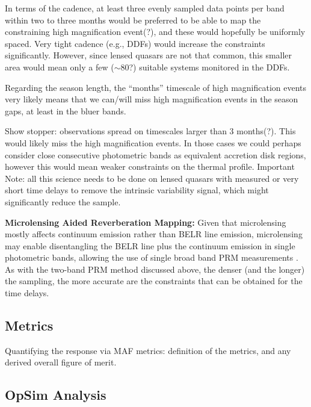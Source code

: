 In terms of the cadence, at least three evenly sampled data points per
band within two to three months would be preferred to be able to map
the constraining high magnification event(?), and these would
hopefully be uniformly spaced. Very tight cadence (e.g., DDFs) would
increase the constraints significantly. However, since lensed quasars
are not that common, this smaller area would mean only a few
($\sim80$?) suitable systems monitored in the DDFs.

Regarding the season length, the ``months'' timescale of high
magnification events very likely means that we can/will miss high
magnification events in the season gaps, at least in the bluer bands.

Show stopper: observations spread on timescales larger than 3 months(?).
This would likely miss the high magnification events. In those cases
we could perhaps consider close consecutive photometric bands as
equivalent accretion disk regions, however this would mean weaker
constraints on the thermal profile.
%
Important Note: all this science needs to be done on lensed quasars
with measured or very short time delays to remove the intrinsic
variability signal, which might significantly reduce the sample.

{\bf Microlensing Aided Reverberation Mapping:} Given that
microlensing mostly affects continuum emission rather than BELR line
emission, microlensing may enable disentangling the BELR line plus the
continuum emission in single photometric bands, allowing the use of
single broad band PRM measurements \citep{SluseandTewes2014}. As with
the two-band PRM method discussed above, the denser (and the longer)
the sampling, the more accurate are the constraints that can be
obtained for the time delays.


\subsection{Metrics}
\label{sec:keyword:metrics}

Quantifying the response via MAF metrics: definition of the metrics,
and any derived overall figure of merit.


\subsection{OpSim Analysis}
\label{sec:keyword:analysis}

